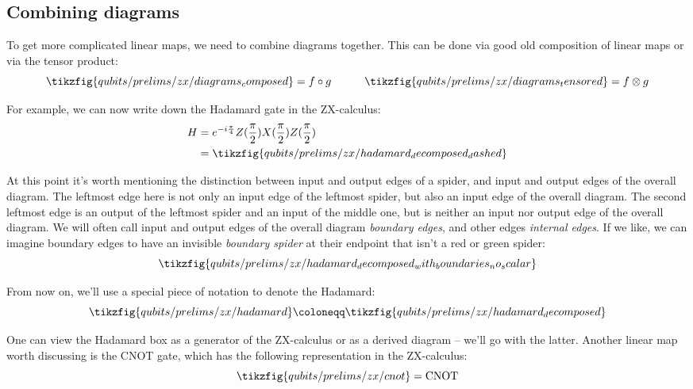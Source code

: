 \subsection{Combining diagrams}

To get more complicated linear maps, we need to combine diagrams together.
This can be done via good old composition of linear maps or via the tensor product:
\begin{equation}
    \tikzfig{qubits/prelims/zx/diagrams_composed} = f \after g
    \qqquad
    \tikzfig{qubits/prelims/zx/diagrams_tensored} = f \otimes g
\end{equation}

For example, we can now write down the Hadamard gate in the ZX-calculus:
\begin{equation}
    \begin{aligned}
        H
        &= e^{-i\frac{\pi}{4}} Z(\frac{\pi}{2}) X(\frac{\pi}{2}) Z(\frac{\pi}{2}) \\
        &= \tikzfig{qubits/prelims/zx/hadamard_decomposed_dashed} \\
    \end{aligned}
\end{equation}

At this point it's worth mentioning the distinction between input and output edges of a spider, and input and output edges of the overall diagram.
The leftmost edge here is not only an input edge of the leftmost spider, but also an input edge of the overall diagram.
The second leftmost edge is an output of the leftmost spider and an input of the middle one, but is neither an input nor output edge of the overall diagram.
We will often call input and output edges of the overall diagram \textit{boundary edges}, and other edges \textit{internal edges}.
If we like, we can imagine boundary edges to have an invisible \textit{boundary spider} at their endpoint that isn't a red or green spider:
\begin{equation}
    \tikzfig{qubits/prelims/zx/hadamard_decomposed_with_boundaries_no_scalar}
\end{equation}

From now on, we'll use a special piece of notation to denote the Hadamard:
\begin{equation}
    \tikzfig{qubits/prelims/zx/hadamard} \coloneqq \tikzfig{qubits/prelims/zx/hadamard_decomposed}
\end{equation}

One can view the Hadamard box as a generator of the ZX-calculus or as a derived diagram -- we'll go with the latter.
Another linear map worth discussing is the CNOT gate, which has the following representation in the ZX-calculus:
\begin{equation}
    \tikzfig{qubits/prelims/zx/cnot} = \text{CNOT}
\end{equation}

